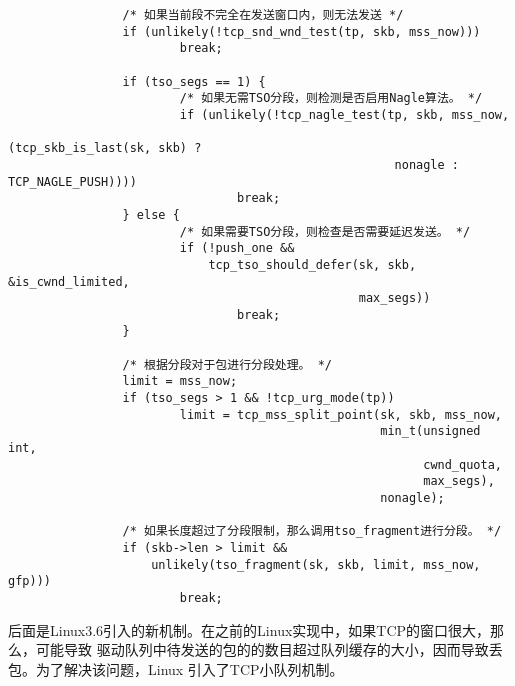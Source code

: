 \begin{verbatim}
                /* 如果当前段不完全在发送窗口内，则无法发送 */
                if (unlikely(!tcp_snd_wnd_test(tp, skb, mss_now)))
                        break;

                if (tso_segs == 1) {
                        /* 如果无需TSO分段，则检测是否启用Nagle算法。 */
                        if (unlikely(!tcp_nagle_test(tp, skb, mss_now,
                                                     (tcp_skb_is_last(sk, skb) ?
                                                      nonagle : TCP_NAGLE_PUSH))))
                                break;
                } else {
                        /* 如果需要TSO分段，则检查是否需要延迟发送。 */
                        if (!push_one &&
                            tcp_tso_should_defer(sk, skb, &is_cwnd_limited,
                                                 max_segs))
                                break;
                }

                /* 根据分段对于包进行分段处理。 */
                limit = mss_now;
                if (tso_segs > 1 && !tcp_urg_mode(tp))
                        limit = tcp_mss_split_point(sk, skb, mss_now,
                                                    min_t(unsigned int,
                                                          cwnd_quota,
                                                          max_segs),
                                                    nonagle);

                /* 如果长度超过了分段限制，那么调用tso_fragment进行分段。 */
                if (skb->len > limit &&
                    unlikely(tso_fragment(sk, skb, limit, mss_now, gfp)))
                        break;
\end{verbatim}
后面是Linux3.6引入的新机制。在之前的Linux实现中，如果TCP的窗口很大，那么，可能导致
驱动队列中待发送的包的的数目超过队列缓存的大小，因而导致丢包。为了解决该问题，Linux
引入了TCP小队列机制。
